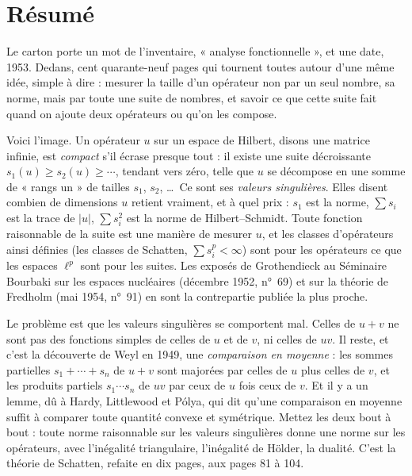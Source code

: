 \documentclass[11pt,a4paper]{article}
\begin{document}
\section*{Résumé}

\begin{resume}
Le carton porte un mot de l'inventaire, « analyse fonctionnelle », et une
date, 1953. Dedans, cent quarante-neuf pages qui tournent toutes autour
d'une même idée, simple à dire : mesurer la taille d'un opérateur non par
un seul nombre, sa norme, mais par toute une suite de nombres, et savoir ce
que cette suite fait quand on ajoute deux opérateurs ou qu'on les compose.

Voici l'image. Un opérateur $u$ sur un espace de Hilbert, disons une
matrice infinie, est \emph{compact} s'il écrase presque tout : il existe
une suite décroissante $s_1(u) \geq s_2(u) \geq \cdots$, tendant vers zéro,
telle que $u$ se décompose en une somme de « rangs un » de tailles $s_1$,
$s_2$, …\ Ce sont ses \emph{valeurs singulières}. Elles disent combien
de dimensions $u$ retient vraiment, et à quel prix : $s_1$ est la norme,
$\sum s_i$ est la trace de $|u|$, $\sum s_i^2$ est la norme de
Hilbert--Schmidt. Toute fonction raisonnable de la suite est une manière
de mesurer $u$, et les classes d'opérateurs ainsi définies (les classes
de Schatten, $\sum s_i^p < \infty$) sont pour les opérateurs ce que les
espaces $\ell^p$ sont pour les suites. Les exposés de Grothendieck au Séminaire Bourbaki sur les espaces nucléaires (décembre 1952, n°~69) et sur la théorie de Fredholm (mai 1954, n°~91) en sont la contrepartie publiée la plus proche.

Le problème est que les valeurs singulières se comportent mal. Celles de
$u + v$ ne sont pas des fonctions simples de celles de $u$ et de $v$, ni
celles de $uv$. Il reste, et c'est la découverte de Weyl en 1949,
une \emph{comparaison en moyenne} : les sommes partielles $s_1 +
\cdots + s_n$ de $u + v$ sont majorées par celles de $u$ plus celles de $v$,
et les produits partiels $s_1 \cdots s_n$ de $uv$ par ceux de $u$ fois
ceux de $v$. Et il y a un lemme, dû à Hardy, Littlewood et Pólya, qui dit
qu'une comparaison en moyenne suffit à comparer toute quantité convexe et
symétrique. Mettez les deux bout à bout : toute norme raisonnable sur les
valeurs singulières donne une norme sur les opérateurs, avec l'inégalité
triangulaire, l'inégalité de Hölder, la dualité. C'est la théorie de
Schatten, refaite en dix pages, aux pages 81 à 104.


\end{resume}
\end{document}
